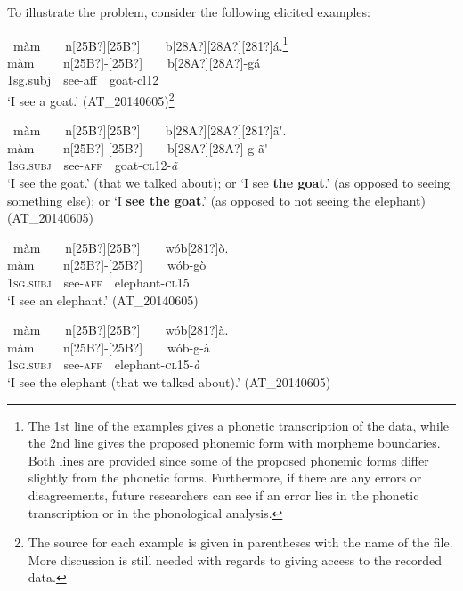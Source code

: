\documentclass[output=paper]{langsci/langscibook}
\begin{document}
To illustrate the problem, consider the following elicited examples:

\ea\label{ex:teo:1}
\ m\`{a}m\ \ \ \ n[25B?][25B?]\ \ \ \ b[28A?][28A?][281?]\'{a}.\footnote{The 1st line of the examples gives a phonetic transcription of the data, while the 2nd line gives the proposed phonemic form with morpheme boundaries. Both lines are provided since some of the proposed phonemic forms differ slightly from the phonetic forms. Furthermore, if there are any errors or disagreements, future researchers can see if an error lies in the phonetic transcription or in the phonological analysis.}\\
\gll m\`{a}m \ \ \ \ n[25B?]\nobreakdash-[25B?]\ \ \ \ b[28A?][28A?]-g\'{a}\\
1sg.subj\ \ see-aff\ \ goat-cl12 \\ 
\glt ‘I see a goat.’ (AT\_20140605)\footnote{The source for each example is given in parentheses with the name of the file. More discussion is still needed with regards to giving access to the recorded data.}\label{bkm:Ref264198703}
\z

\ea\label{ex:teo:2}
\ m\`{a}m\ \ \ \ n[25B?][25B?]\ \ \ \ b[28A?][28A?][281?]\~{a}\'{ }.\\
\gll m\`{a}m \ \ \ \ n[25B?]\nobreakdash-[25B?]\ \ \ \ b[28A?][28A?]-g\nobreakdash-\~{a}\'{ }\\
\textsc{1sg}.\textsc{subj}\ \ see-\textsc{aff}\ \ goat-\textsc{cl12}{}-\textit{\~{a}}\\
\glt ‘I see the goat.’ (that we talked about); or ‘I see \textbf{the goat}.’ (as opposed to seeing something else); or ‘I \textbf{see the goat}.’ (as opposed to not seeing the elephant) (AT\_20140605)
\z

\ea\label{ex:teo:3}\label{bkm:Ref264213600}\ m\`{a}m\ \ \ \ n[25B?][25B?]\ \ \ \ w\'{o}b[281?]\`{o}.\\
\gll m\`{a}m \ \ \ \ n[25B?]\nobreakdash-[25B?]\ \ \ \ w\'{o}b-g\`{o}\\
\textsc{1sg.subj}\ \ see-\textsc{aff}\ \ elephant-\textsc{cl15}\\
\glt  ‘I see an elephant.’ (AT\_20140605)
\z

\ea\label{ex:teo:4}
\ m\`{a}m\ \ \ \ n[25B?][25B?]\ \ \ \ w\'{o}b[281?]\`{a}.\\
\gll m\`{a}m \ \ \ \ n[25B?]\nobreakdash-[25B?]\ \ \ \ w\'{o}b-g\nobreakdash-\`{a}\\
\textsc{1sg.subj\ \ }see-\textsc{aff}\ \ elephant-\textsc{cl15-}\textit{\`{a}} \\
\glt ‘I see the elephant (that we talked about).’ (AT\_20140605)
\z
\end{document}
